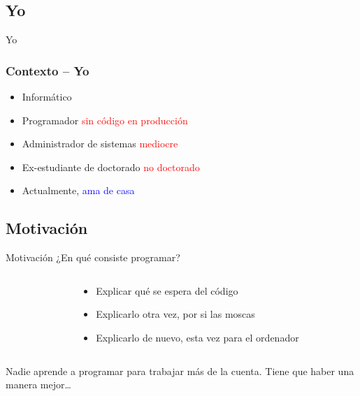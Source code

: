 \documentclass[xcolor=x11names,compress]{beamer}
\renewcommand{\(}{\begin{columns}}
\renewcommand{\)}{\end{columns}}
\newcommand{\<}[1]{\begin{column}{#1}}
\renewcommand{\>}{\end{column}}
\begin{document}
\subsection{Yo}
\begin{frame}{Yo}
    \frametitle{Contexto -- Yo}
    \begin{itemize}
        \item Informático \pause
        \item Programador \textcolor{red}{sin código en producción} \pause
        \item Administrador de sistemas \textcolor{red}{mediocre} \pause
        \item Ex-estudiante de doctorado \textcolor{red}{no doctorado} \pause
        \item Actualmente, \textcolor{blue}{ama de casa}
    \end{itemize}
\end{frame}

\subsection{Motivación}
\begin{frame}{Motivación}
    ¿En qué consiste programar?
    \begin{columns}
        \begin{column}{.5\linewidth}
        \begin{block}
            \codeFactorial
        \end{block}
        \end{column}
        \begin{column}{.5\linewidth}
            \begin{itemize}\itemsep25pt \pause
                \item Explicar qué se espera del código\pause
                \item Explicarlo otra vez, por si las moscas\pause
                \item Explicarlo de nuevo, esta vez para el ordenador\pause
            \end{itemize}
        \end{column}
    \end{columns}
    Nadie aprende a programar para trabajar más de la cuenta. Tiene que haber una manera mejor\ldots
\end{frame}
\end{document}
